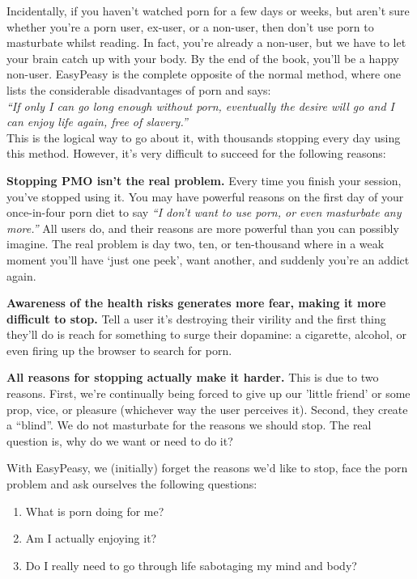 \documentclass[
]{book}
\begin{document}
Incidentally, if you haven't watched porn for a few days or weeks, but aren't sure whether you're a porn user, ex-user, or a non-user, then don't use porn to masturbate whilst reading. In fact, you're already a non-user, but we have to let your brain catch up with your body. By the end of the book, you'll be a happy non-user. EasyPeasy is the complete opposite of the normal method, where one lists the considerable disadvantages of porn and says:\\
\emph{``If only I can go long enough without porn, eventually the desire will go and I can enjoy life again, free of slavery.''}\\
This is the logical way to go about it, with thousands stopping every day using this method. However, it's very difficult to succeed for the following reasons:

\textbf{Stopping PMO isn't the real problem.}
Every time you finish your session, you've stopped using it. You may have powerful reasons on the first day of your once-in-four porn diet to say \emph{``I don't want to use porn, or even masturbate any more.''} All users do, and their reasons are more powerful than you can possibly imagine. The real problem is day two, ten, or ten-thousand where in a weak moment you'll have `just one peek', want another, and suddenly you're an addict again.

\textbf{Awareness of the health risks generates more fear, making it more difficult to stop.}
Tell a user it's destroying their virility and the first thing they'll do is reach for something to surge their dopamine: a cigarette, alcohol, or even firing up the browser to search for porn.

\textbf{All reasons for stopping actually make it harder.}
This is due to two reasons. First, we're continually being forced to give up our 'little friend' or some prop, vice, or pleasure (whichever way the user perceives it). Second, they create a ``blind''. We do not masturbate for the reasons we should stop. The real question is, why do we want or need to do it?

With EasyPeasy, we (initially) forget the reasons we'd like to stop, face the porn problem and ask ourselves the following questions:

\begin{enumerate}
\def\labelenumi{\arabic{enumi}.}
\item
  What is porn doing for me?
\item
  Am I actually enjoying it?
\item
  Do I really need to go through life sabotaging my mind and body?
\end{enumerate}
\end{document}
